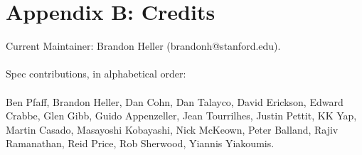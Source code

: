 \section{Appendix B: Credits}

Current Maintainer: Brandon Heller (brandonh@stanford.edu).
\\\\
Spec contributions, in alphabetical order:
\\\\
Ben Pfaff,
Brandon Heller,
Dan Cohn,
Dan Talayco,
David Erickson,
Edward Crabbe,
Glen Gibb,
Guido Appenzeller,
Jean Tourrilhes,
Justin Pettit,
KK Yap,
Martin Casado,
Masayoshi Kobayashi,
Nick McKeown,
Peter Balland,
Rajiv Ramanathan,
Reid Price,
Rob Sherwood,
Yiannis Yiakoumis.
